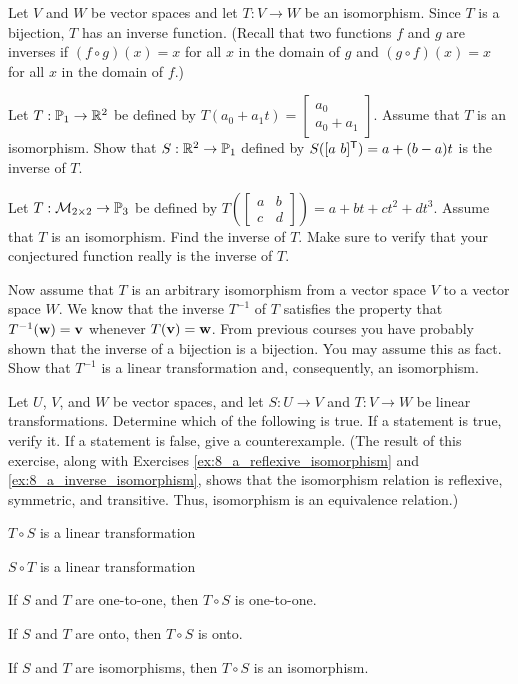 \item \label{ex:8_a_inverse_isomorphism} Let $V$ and $W$ be vector spaces and let $T : V \to W$ be an isomorphism.  Since $T$ is a bijection, $T$ has an inverse function. (Recall that two functions $f$ and $g$ are inverses if $(f \circ g)(x) = x$ for all $x$ in the domain of $g$ and $(g \circ f)(x) = x$ for all $x$ in the domain of $f$.)
\ba
\item Let $T: \mathbb{P}_1 \to \mathbb{R}^2$ be defined by $T(a_0+a_1t) = \left[ \begin{array}{c} a_0\\a_0+a_1 \end{array} \right]$. Assume that $T$ is an isomorphism. Show that $S: \mathbb{R}^2 \to \mathbb{P}_1$ defined by $S([a \ b]^{\mathsf{T}}) = a + (b-a)t$ is the inverse of $T$. 

\item Let $T: \mathcal{M}_{2 \times 2} \to \mathbb{P}_3$ be defined by $T\left(\left[ \begin{array}{cc} a&b\\ c&d \end{array} \right] \right) = a+bt+ct^2+dt^3$. Assume that $T$ is an isomorphism. Find the inverse of $T$. Make sure to verify that your conjectured function really is the inverse of $T$. 
	
\item Now assume that $T$ is an arbitrary isomorphism from a vector space $V$ to a vector space $W$. We know that the inverse $T^{-1}$ of $T$ satisfies the property that $T^{-1}(\mathbf{w}) = \mathbf{v}$ whenever $T(\mathbf{v}) = \mathbf{w}$. From previous courses you have probably shown that the inverse of a bijection is a bijection. You may assume this as fact. Show that $T^{-1}$ is a linear transformation and, consequently, an isomorphism. 

\ea


\item Let $U$, $V$, and $W$ be vector spaces, and let $S : U \to V$ and $T : V \to W$ be linear transformations. Determine which of the following is true. If a statement is true, verify it. If a statement is false, give a counterexample. (The result of this exercise, along with Exercises \ref{ex:8_a_reflexive_isomorphism} and \ref{ex:8_a_inverse_isomorphism}, shows that the isomorphism relation is reflexive, symmetric, and transitive. Thus, isomorphism is an equivalence relation.) 
	\ba
	\item $T \circ S$ is a linear transformation
	\item $S \circ T$ is a linear transformation
	\item If $S$ and $T$ are one-to-one, then $T \circ S$ is one-to-one.
	\item If $S$ and $T$ are onto, then $T \circ S$ is onto.
	\item If $S$ and $T$ are isomorphisms, then $T \circ S$ is an isomorphism.
	\ea
	

